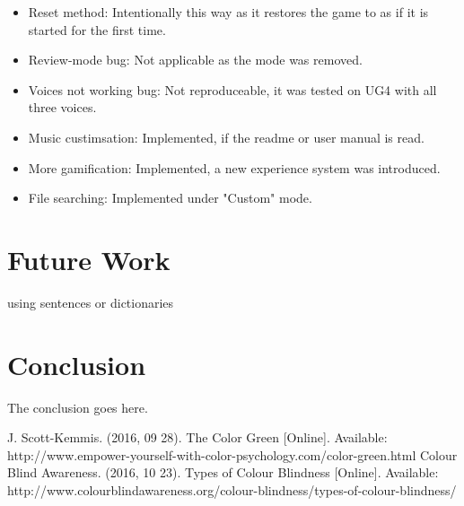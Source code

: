 \documentclass[conference]{IEEEtran}
\begin{document}
\begin{itemize}
			\item Reset method: Intentionally this way as it restores the game to as if it is started for the first time.
			\item Review-mode bug: Not applicable as the mode was removed.
			\item Voices not working bug: Not reproduceable, it was tested on UG4 with all three voices.
			\item Music custimsation: Implemented, if the readme or user manual is read.
			\item More gamification: Implemented, a new experience system was introduced.
			\item File searching: Implemented under "Custom" mode.
		\end{itemize}

\section{Future Work}
using sentences or dictionaries
\section{Conclusion}
The conclusion goes here.



%
%
%
\begin{thebibliography}{1}
J. Scott-Kemmis. (2016, 09 28). The Color Green [Online]. Available: http://www.empower-yourself-with-color-psychology.com/color-green.html
Colour Blind Awareness. (2016, 10 23). Types of Colour Blindness [Online]. Available: http://www.colourblindawareness.org/colour-blindness/types-of-colour-blindness/
\end{thebibliography}




\end{document}
